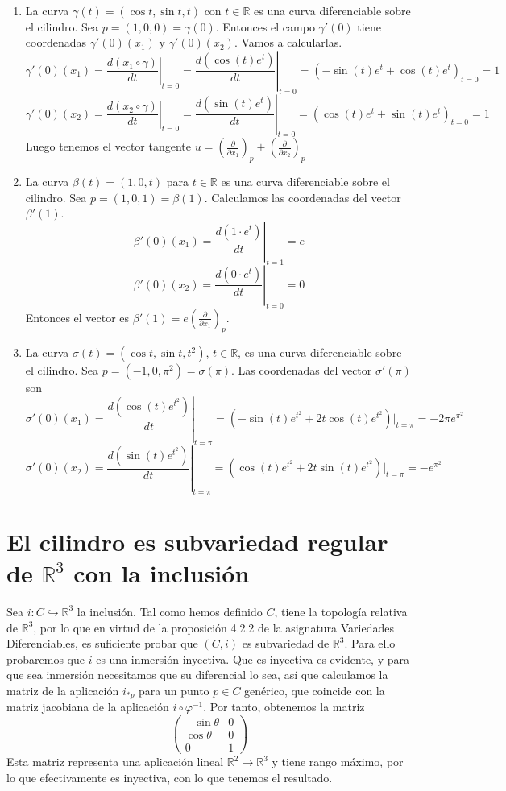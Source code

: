 \documentclass[twoside, 11pt]{article}
\theoremstyle{definition}
\newcommand{\R}{\mathbb{R}}
\newcommand{\parcial}[2]{\frac{\partial #1}{\partial #2}}
\begin{document}
\begin{enumerate}
\item La curva $\gamma(t)=(\cos t, \sin t, t)$ con $t\in\R$ es una curva diferenciable sobre el cilindro. Sea $p=(1,0,0) =\gamma(0)$. Entonces el campo $\gamma'(0)$ tiene coordenadas $\gamma'(0)(x_1)$ y $\gamma'(0)(x_2)$. Vamos a calcularlas. 
\[
\gamma'(0)(x_1)=\left.\frac{d(x_1\circ\gamma)}{dt}\right|_{t=0}=\left.\frac{d(\cos(t)e^t)}{dt}\right|_{t=0}=(-\sin(t)e^t+\cos(t)e^t)_{t=0}=1
\]
\[
\gamma'(0)(x_2)=\left.\frac{d(x_2\circ\gamma)}{dt}\right|_{t=0}=\left.\frac{d(\sin(t)e^t)}{dt}\right|_{t=0}=(\cos(t)e^t+\sin(t)e^t)_{t=0}=1
\]
Luego tenemos el vector tangente $u=\left(\parcial{}{x_1}\right)_p+\left(\parcial{}{x_2}\right)_p$

\item  La curva $\beta(t)=(1, 0, t)$ para $t\in\R$ es una curva diferenciable sobre el cilindro. Sea $p=(1,0,1)=\beta(1)$. Calculamos las coordenadas del vector $\beta'(1)$.
\[
\beta'(0)(x_1)=\left.\frac{d(1\cdot e^t)}{dt}\right|_{t=1}=e
\]
\[
\beta'(0)(x_2)=\left.\frac{d(0\cdot e^t)}{dt}\right|_{t=0}=0
\]
Entonces el vector es $\beta'(1)=e\left(\parcial{}{x_1}\right)_p$. 

\item La curva $\sigma(t)=(\cos t, \sin t, t^2)$, $t\in\R$, es una curva diferenciable sobre el cilindro. Sea $p=(-1,0,\pi^2)=\sigma(\pi)$. Las coordenadas del vector $\sigma'(\pi)$ son
\[
\sigma'(0)(x_1)=\left.\frac{d(\cos(t) e^{t^2})}{dt}\right|_{t=\pi}=(-\sin(t)e^{t^2}+2t\cos(t)e^{t^2})|_{t=\pi}=-2\pi e^{\pi^2}
\]
\[
\sigma'(0)(x_2)=\left.\frac{d(\sin(t) e^{t^2})}{dt}\right|_{t=\pi}=(\cos(t)e^{t^2}+2t\sin(t)e^{t^2})|_{t=\pi}=-e^{\pi^2}
\]

\end{enumerate}


\section{El cilindro es subvariedad regular de $\R^3$ con la inclusión}

Sea $i:C\hookrightarrow \R^3$ la inclusión. Tal como hemos definido $C$, tiene la topología relativa de $\R^3$, por lo que en virtud de la proposición 4.2.2 de la asignatura Variedades Diferenciables, es suficiente probar que $(C,i)$ es subvariedad de $\R^3$. Para ello probaremos que $i$ es una inmersión inyectiva. Que es inyectiva es evidente, y para que sea inmersión necesitamos que su diferencial lo sea, así que calculamos la matriz de la aplicación $i_{*p}$ para un punto $p\in C$ genérico, que coincide con la matriz jacobiana de la aplicación $i\circ \varphi^{-1}$. Por tanto, obtenemos la matriz
\[
\begin{pmatrix}
-\sin\theta & 0 \\
\cos\theta & 0\\
0 & 1
\end{pmatrix}
\]
Esta matriz representa una aplicación lineal $\R^2\to\R^3$ y tiene rango máximo, por lo que efectivamente es inyectiva, con lo que tenemos el resultado. 
\end{document}
